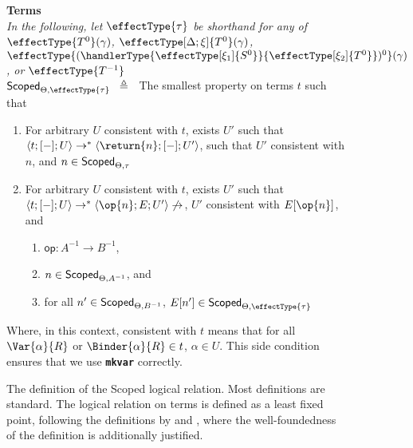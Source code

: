 \begin{figure}
\begin{source-desc}
\textbf{Terms}\\
{\scriptsize{\textit{In the following, let $\effectType{\tau}$ be shorthand for any of $\effectType{T^{0}} (\gamma)$, $\effectType[\Delta; \xi]{T^{0}} (\gamma)$, $\effectType{(\handlerType{\effectType[\xi_1]{S^0}}{\effectType[\xi_2]{T^0}})^{0}} (\gamma)$, or $\effectType{T^{-1}}$}}}\\

$\scoped{\effectType{\tau}} \hspace{2mm} \triangleq \hspace{2mm}$ The smallest property on terms $t$ such that 
\begin{enumerate}
  \item For arbitrary $U$ consistent with $t$, exists $U'$ such that $\langle t;[-];U \rangle \to^{*} \langle \return{n}; [-]; U' \rangle$, such that $U'$ consistent with $n$, and $n \in \textsf{Scoped}_{{\Theta}, {\tau}}$ 
  \item For arbitrary $U$ consistent with $t$, exists $U'$ such that $\langle t;[-];U \rangle \to^{*} \langle \op{n}; E; U' \rangle \not\to$, $U'$ consistent with $E[\op{n}]$, and 
  \begin{enumerate}
    \item $\textsf{op}: A^{-1} \to B^{-1}$,
    \item $n \in \textsf{Scoped}_{{\Theta}, {A^{-1}}}$, and 
    \item for all $n' \in \textsf{Scoped}_{{\Theta}, {B^{-1}}}$, $E[n'] \in \scoped{\effectType{\tau}}$
  \end{enumerate}
\end{enumerate}
Where, in this context, consistent with $t$ means that for all $\Var{\alpha}{R}$ or $\Binder{\alpha}{R} \in t$, $\alpha \in U$. This side condition ensures that we use \textbf{\texttt{mkvar}} correctly.
\end{source-desc}
\caption{The definition of the \textsf{Scoped} logical relation. Most definitions are standard. The logical relation on terms is defined as a least fixed point, following the definitions by \citet{plotkin-2025} and \citet{kuchta-2023}, where the well-foundedness of the definition is additionally justified.}
\label{fig:logical-relation-defn}
\end{figure}

